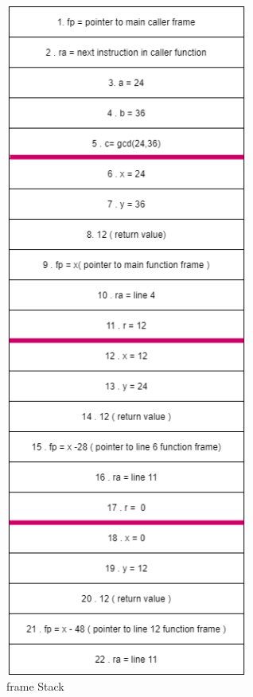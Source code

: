 \begin{figure}[htp]
    \centering
    \includegraphics[width=8cm]{images/q2.png}
    \caption{frame Stack }
\end{figure}  